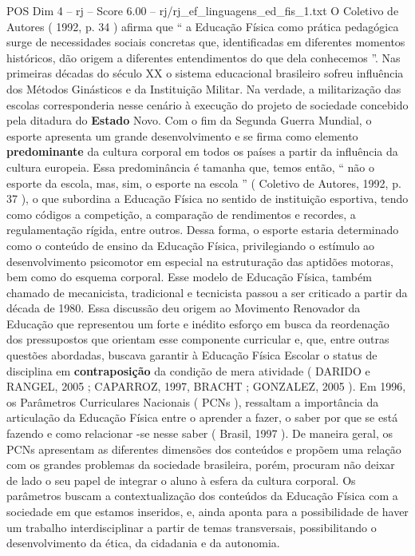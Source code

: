 \begin{textsample}{POS Dim 4 – rj – Score 6.00 – rj/rj\_ef\_linguagens\_ed\_fis\_1.txt}
O Coletivo de Autores ( 1992, p. 34 ) afirma que “ a Educação Física como prática pedagógica surge de necessidades sociais concretas que, identificadas em diferentes momentos históricos, dão origem a diferentes entendimentos do que dela conhecemos ”.
Nas primeiras décadas do século XX o sistema educacional brasileiro sofreu influência dos Métodos Ginásticos e da Instituição Militar.
Na verdade, a militarização das escolas corresponderia nesse cenário à execução do projeto de sociedade concebido pela ditadura do \textbf{Estado} Novo.
Com o fim da Segunda Guerra Mundial, o esporte apresenta um grande desenvolvimento e se firma como elemento \textbf{predominante} da cultura corporal em todos os países a partir da influência da cultura europeia.
Essa predominância é tamanha que, temos então, “ não o esporte da escola, mas, sim, o esporte na escola ” ( Coletivo de Autores, 1992, p. 37 ), o que subordina a Educação Física no sentido de instituição esportiva, tendo como códigos a competição, a comparação de rendimentos e recordes, a regulamentação rígida, entre outros.
Dessa forma, o esporte estaria determinado como o conteúdo de ensino da Educação Física, privilegiando o estímulo ao desenvolvimento psicomotor em especial na estruturação das aptidões motoras, bem como do esquema corporal.
Esse modelo de Educação Física, também chamado de mecanicista, tradicional e tecnicista passou a ser criticado a partir da década de 1980.
Essa discussão deu origem ao Movimento Renovador da Educação que representou um forte e inédito esforço em busca da reordenação dos pressupostos que orientam esse componente curricular e, que, entre outras questões abordadas, buscava garantir à Educação Física Escolar o status de disciplina em \textbf{contraposição} da condição de mera atividade ( DARIDO e RANGEL, 2005 ; CAPARROZ, 1997, BRACHT ; GONZALEZ, 2005 ).
Em 1996, os Parâmetros Curriculares Nacionais ( PCNs ), ressaltam a importância da articulação da Educação Física entre o aprender a fazer, o saber por que se está fazendo e como relacionar -se nesse saber ( Brasil, 1997 ).
De maneira geral, os PCNs apresentam as diferentes dimensões dos conteúdos e propõem uma relação com os grandes problemas da sociedade brasileira, porém, procuram não deixar de lado o seu papel de integrar o aluno à esfera da cultura corporal.
Os parâmetros buscam a contextualização dos conteúdos da Educação Física com a sociedade em que estamos inseridos, e, ainda aponta para a possibilidade de haver um trabalho interdisciplinar a partir de temas transversais, possibilitando o desenvolvimento da ética, da cidadania e da autonomia.

\end{textsample}
